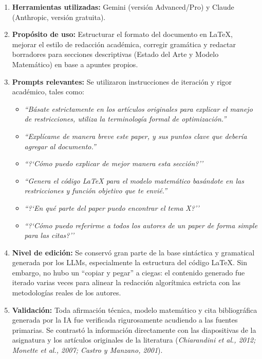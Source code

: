 \documentclass[letter, 10pt]{article}
\begin{document}
\begin{enumerate}
    \item \textbf{Herramientas utilizadas:} Gemini (versi\'on Advanced/Pro) y Claude (Anthropic, versi\'on gratuita).
    
    \item \textbf{Prop\'osito de uso:} Estructurar el formato del documento en LaTeX, mejorar el estilo de redacci\'on acad\'emica, corregir gram\'atica y redactar borradores para secciones descriptivas (Estado del Arte y Modelo Matem\'atico) en base a apuntes propios.
    
    \item \textbf{Prompts relevantes:} Se utilizaron instrucciones de iteraci\'on y rigor acad\'emico, tales como: 
    \begin{itemize}
        \item \textit{``B\'asate estrictamente en los art\'iculos originales para explicar el manejo de restricciones, utiliza la terminolog\'ia formal de optimizaci\'on.''}
        \item \textit{``Expl\'icame de manera breve este paper, y sus puntos clave que deber\'ia agregar al documento.''}
        \item \textit{``?`C\'omo puedo explicar de mejor manera esta secci\'on?''}
        \item \textit{``Genera el c\'odigo LaTeX para el modelo matem\'atico bas\'andote en las restricciones y funci\'on objetivo que te envi\'e.''}
        \item \textit{``?`En qu\'e parte del paper puedo encontrar el tema X?''}
        \item \textit{``?`C\'omo puedo referirme a todos los autores de un paper de forma simple para las citas?''}
    \end{itemize}
    
    \item \textbf{Nivel de edici\'on:} Se conserv\'o gran parte de la base sint\'actica y gramatical generada por los LLMs, especialmente la estructura del c\'odigo LaTeX. Sin embargo, no hubo un ``copiar y pegar'' a ciegas: el contenido generado fue iterado varias veces para alinear la redacci\'on algor\'itmica estricta con las metodolog\'ias reales de los autores.
    
    \item \textbf{Validaci\'on:} Toda afirmaci\'on t\'ecnica, modelo matem\'atico y cita bibliogr\'afica generada por la IA fue verificada rigurosamente acudiendo a las fuentes primarias. Se contrast\'o la informaci\'on directamente con las diapositivas de la asignatura y los art\'iculos originales de la literatura (\textit{Chiarandini et al., 2012; Monette et al., 2007; Castro y Manzano, 2001}).
\end{enumerate}




\end{document}
